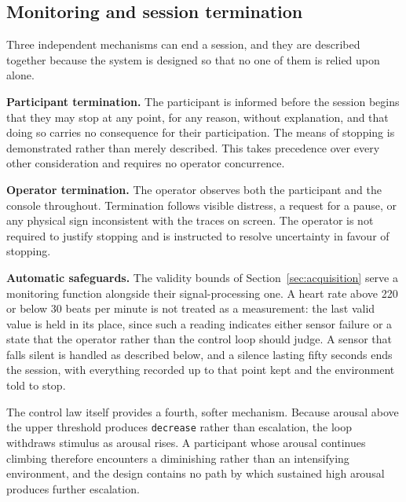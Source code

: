 \subsection{Monitoring and session termination}
\label{sec:safety}

Three independent mechanisms can end a session, and they are
described together because the system is designed so that no one
of them is relied upon alone.

\textbf{Participant termination.} The participant is informed
before the session begins that they may stop at any point, for
any reason, without explanation, and that doing so carries no
consequence for their participation. The means of stopping is
demonstrated rather than merely described. This takes precedence
over every other consideration and requires no operator
concurrence.

\textbf{Operator termination.} The operator observes both the
participant and the console throughout. Termination follows
visible distress, a request for a pause, or any physical sign
inconsistent with the traces on screen. The operator is not
required to justify stopping and is instructed to resolve
uncertainty in favour of stopping.

\textbf{Automatic safeguards.} The validity bounds of
Section~\ref{sec:acquisition} serve a monitoring function
alongside their signal-processing one. A heart rate above 220 or
below 30 beats per minute is not treated as a measurement: the last
valid value is held in its place, since such a reading indicates
either sensor failure or a state that the operator rather than the
control loop should judge. A sensor that falls silent is handled as
described below, and a silence lasting fifty seconds ends the
session, with everything recorded up to that point kept and the
environment told to stop.

The control law itself provides a fourth, softer mechanism. Because
arousal above the upper threshold produces \texttt{decrease}
rather than escalation, the loop withdraws stimulus as arousal
rises. A participant whose arousal continues climbing therefore
encounters a diminishing rather than an intensifying environment,
and the design contains no path by which sustained high arousal
produces further escalation.


